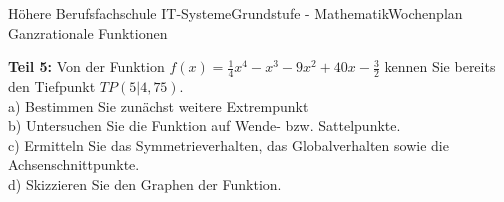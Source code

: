 \documentclass[oneside,openany,headings=optiontotoc,11pt,numbers=noenddot]{scrreprt}
\begin{document}
\begin{worksheet}{Höhere Berufsfachschule IT-Systeme}{Grundstufe - Mathematik}{Wochenplan Ganzrationale Funktionen}
\begin{framed}
			\textbf{Teil 5:} Von der Funktion \(f(x) = \frac{1}{4}x^4 - x^3 - 9x^2 + 40x - \frac{3}{2}\) kennen Sie bereits den Tiefpunkt \(TP(5|4,75)\).\\
			a) Bestimmen Sie zunächst weitere Extrempunkt\\
			b) Untersuchen Sie die Funktion auf Wende- bzw. Sattelpunkte.\\
			c) Ermitteln Sie das Symmetrieverhalten, das Globalverhalten sowie die Achsenschnittpunkte.\\
			d) Skizzieren Sie den Graphen der Funktion.
		\end{framed}
	\end{worksheet}
\end{document}
